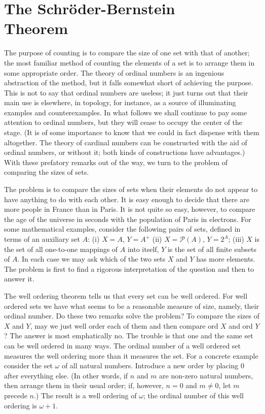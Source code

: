 
\chapter[The Schröder-Bernstein Theorem]{The Schröder-Bernstein\\ Theorem} 

The purpose of counting is to compare the size of one set with that of another; the most familiar method of counting the elements of a set is to arrange them in some appropriate order. The theory of ordinal numbers is an ingenious abstraction of the method, but it falls somewhat short of achieving the purpose. This is not to say that ordinal numbers are useless; it just turns out that their main use is elsewhere, in topology, for instance, as a source of illuminating examples and counterexamples. In what follows we shall continue to pay some attention to ordinal numbers, but they will cease to occupy the center of the stage. (It is of some importance to know that we could in fact dispense with them altogether. The theory of cardinal numbers can be constructed with the aid of ordinal numbers, or without it; both kinds of constructions have advantages.) With these prefatory remarks out of the way, we turn to the problem of comparing the sizes of sets. 

The problem is to compare the sizes of sets when their elements do not appear to have anything to do with each other. It is easy enough to decide that there are more people in France than in Paris. It is not quite so easy, however, to compare the age of the universe in seconds with the population of Paris in electrons. For some mathematical examples, consider the following pairs of sets, defined in terms of an auxiliary set $A$: (i) $X = A$, $Y = A^{+}$ (ii) $X = \mathcal{P}(A)$, $Y = 2^{A}$; (iii) $X$ is the set of all one-to-one mappings of $A$ into itself, $Y$ is the set of all finite subsets of $A$. In each case we may ask which of the two sets $X$ and $Y$ has more elements. The problem is first to find a rigorous interpretation of the question and then to answer it. 

The well ordering theorem tells us that every set can be well ordered. For well ordered sets we have what seems to be a reasonable measure of size, namely, their ordinal number. Do these two remarks solve the problem? To compare the sizes of $X$ and $Y$, may we just well order each of them and then compare ord $X$ and ord $Y$? The answer is most emphatically no. The trouble is that one and the same set can be well ordered in many ways. The ordinal number of a well ordered set measures the well ordering more than it measures the set. For a concrete example consider the set $\omega$ of all natural numbers. Introduce a new order by placing $0$ after everything else. (In other words, if $n$ and $m$ are non-zero natural numbers, then arrange them in their usual order; if, however, $n = 0$ and $m \neq 0$, let $m$ precede $n$.) The result is a well ordering of $\omega$; the ordinal number of this well ordering is $\omega + 1$.

